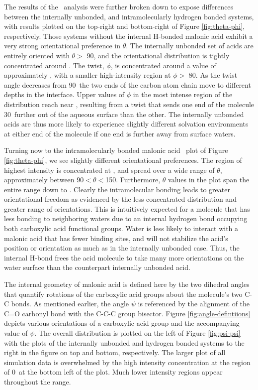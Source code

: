 The results of the \thetaphi~analysis were further broken down to expose differences between the internally unbonded, and intramolecularly hydrogen bonded systems, with results plotted on the top-right and bottom-right of Figure \ref{fig:theta-phi}, respectively. Those systems without the internal H-bonded malonic acid exhibit a very strong orientational preference in $\theta$. The internally unbonded set of acids are entirely oriented with $\theta >$ 90\degr, and the orientational distribution is tightly concentrated around \degr. The twist, $\phi$, is concentrated around a value of approximately \degr, with a smaller high-intensity region at $\phi >$ 80\degr. As the twist angle decreases from 90\degr~the two ends of the carbon atom chain move to different depths in the interface. Upper values of $\phi$ in the most intense region of the distribution reach near \degr, resulting from a twist that sends one end of the molecule 30\degr~further out of the aqueous surface than the other. The internally unbonded acids are thus more likely to experience slightly different solvation environments at either end of the molecule if one end is further away from surface waters.

Turning now to the intramolecularly bonded malonic acid \thetaphi~plot of Figure \ref{fig:theta-phi}, we see slightly different orientational preferences. The region of highest intensity is concentrated at \degr, and spread over a wide range of $\theta$, approximately between 90\degr $< \theta <$150\degr. Furthermore, $\theta$ values in the plot span the entire range down to \degr. Clearly the intramolecular bonding leads to greater orientational freedom as evidenced by the less concentrated distribution and greater range of orientations. This is intuitively expected for a molecule that has less bonding to neighboring waters due to an internal hydrogen bond occupying both carboxylic acid functional groups. Water is less likely to interact with a malonic acid that has fewer binding sites, and will not stabilize the acid's position or orientation as much as in the internally unbonded case. Thus, the internal H-bond frees the acid molecule to take many more orientations on the water surface than the counterpart internally unbonded acid.

The internal geometry of malonic acid is defined here by the two dihedral angles that quantify rotations of the carboxylic acid groups about the molecule's two C-C bonds. As mentioned earlier, the angle $\psi$ is referenced by the alignment of the C=O carbonyl bond with the C-C-C group bisector. Figure \ref{fig:angle-defintiions} depicts various orientations of a carboxylic acid group and the accompanying value of $\psi$. The overall \psipsi distribution is plotted on the left of Figure \ref{fig:psi-psi} with the plots of the internally unbonded and hydrogen bonded systems to the right in the figure on top and bottom, respectively. The larger plot of all simulation data is overwhelmed by the high intensity concentration at the \psipsi region of 0\degr~at the bottom left of the plot. Much lower intensity regions appear throughout the \psipsi range.


